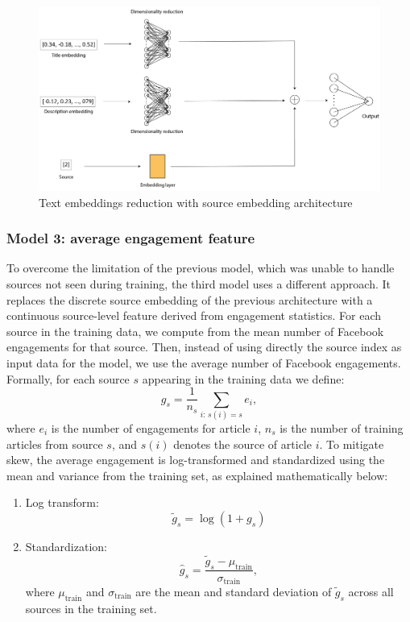 \documentclass[a4paper,twoside,12pt]{book}
\begin{document}
\begin{figure}[h!]
	\centering
	\includegraphics[width=1.1\textwidth]{./img/2_mlp_architecture.png}
	\caption{Text embeddings reduction with source embedding architecture}
\end{figure}

\clearpage

\subsubsection*{Model 3: average engagement feature} \label{model 3}

To overcome the limitation of the previous model, which was unable to handle sources not seen during training, the third model uses a different approach. It replaces the discrete source embedding of the previous architecture with a continuous source-level feature derived from engagement statistics.  
For each source in the training data, we compute from the mean number of Facebook engagements for that source. Then, instead of using directly the source index as input data for the model, we use the average number of Facebook engagements. Formally, for each source $s$ appearing in the training data we define:
\[
g_s = \frac{1}{n_s} \sum_{i:\, s(i) = s} e_i,
\]
where $e_i$ is the number of engagements for article $i$, $n_s$ is the number of training articles from source $s$, and $s(i)$ denotes the source of article $i$.  
To mitigate skew, the average engagement is log-transformed and standardized using the mean and variance from the training set, as explained mathematically below:

\begin{enumerate}
	\item Log transform:
	\[
	\tilde{g}_s = \log\left(1 + g_s\right)
	\]
	\item Standardization:
	\[
	\hat{g}_s = \frac{\tilde{g}_s - \mu_{\text{train}}}{\sigma_{\text{train}}},
	\]
	where $\mu_{\text{train}}$ and $\sigma_{\text{train}}$ are the mean and standard deviation of $\tilde{g}_s$ across all sources in the training set.
\end{enumerate}
\end{document}
